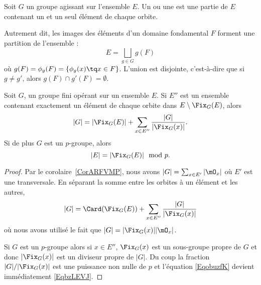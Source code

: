 \begin{definition}  \label{DefcSuYxz}
	Soit \( G\) un groupe agissant sur l'ensemble \( E\). Un  ou une  est une partie de \( E\) contenant un et un seul élément de chaque orbite.
\end{definition}
Autrement dit, les images des éléments d'un domaine fondamental \( F\) forment une partition de l'ensemble :
\begin{equation}
	E=\bigsqcup_{g\in G}g(F)
\end{equation}
où  \( g(F) = \phi_g(F) = \{ \phi_g(x) \tq x \in F\} \). L'union est disjointe, c'est-à-dire que si \( g\neq g'\), alors \( g(F)\cap g'(F)=\emptyset\).


\begin{proposition}       \label{PropUyLPdp}
	Soit \( G\), un groupe fini opérant sur un ensemble \( E\). Si \( E''\) est un ensemble contenant exactement un élément de chaque orbite dans \( E\setminus\Fix_G(E)\), alors
	\begin{equation}        \label{EqobuzfK}
		| G |=| \Fix_G(E) |+\sum_{x\in E''}\frac{ | G | }{ | \Fix_G(x) | }.
	\end{equation}
	Si de plus \( G\) est un \( p\)-groupe, alors
	\begin{equation}    \label{EqbzLEVJ}
		| E |=| \Fix_G(E) |\mod p.
	\end{equation}
\end{proposition}

\begin{proof}
	Par le corolaire~\ref{CorARFVMP}, nous avons \( | G |=\sum_{x\in E'}| \mO_x |\) où \( E'\) est une transversale.  En séparant la somme entre les orbites à un élément et les autres,
	\begin{equation}    \label{EqeggkBs}
		| G |=\Card(\Fix_G(E))+\sum_{x\in E''}\frac{ | G | }{ | \Fix_G(x) | }
	\end{equation}  \label{EqDgYbhm}
	où nous avons utilisé le fait que \( | G |=| \Fix_G(x) | |\mO_x |\).

	Si \( G\) est un \( p\)-groupe alors si \( x\in E''\), \( \Fix_G(x)\) est un sous-groupe propre de \( G\) et donc \( | \Fix_G(x) |\) est un diviseur propre de \( | G |\). Du coup la fraction \( | G |/|\Fix_G(x)|\) est une puissance non nulle de \( p\) et l'équation \eqref{EqobuzfK} devient immédiatement \eqref{EqbzLEVJ}.
\end{proof}

